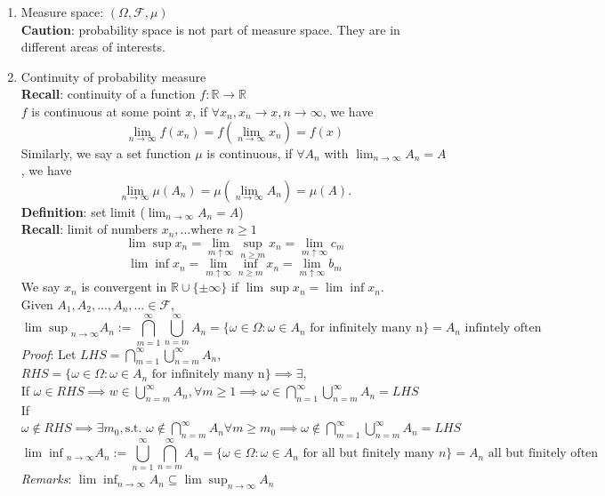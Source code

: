 \documentclass[11pt]{article}
\begin{document}
\begin{enumerate}
\item Measure space: $(\Omega ,\mathcal{F}, \mu)$\\
\textbf{Caution}: probability space is not part of measure space. They are in different areas of interests.

\item Continuity of probability measure\\
\textbf{Recall}: continuity of a function $f: \mathbb{R} \rightarrow \mathbb{R}$\\
$f$ is continuous at some point $x$, if $\forall x_n, x_n \rightarrow x, n \rightarrow \infty$, we have $$\lim_{n \rightarrow \infty} f(x_n)= f(\lim_{n \rightarrow \infty} x_n)= f(x)$$
Similarly, we say a set function $\mu$ is continuous, if $\forall A_n$ with $\lim_{n \rightarrow \infty} A_n =A$, we have $$\lim_{n \rightarrow \infty} \mu (A_n) = \mu (\lim _{n \rightarrow \infty} A_n) = \mu (A).$$
\textbf{Definition}: set limit ($\lim_{n \rightarrow \infty} A_n =A$)\\
\textbf{Recall}: limit of numbers $x_n,... \text{where } n \geq 1$
$$\lim \sup x_n = \lim_{m \uparrow \infty} \sup_{n \geq m} x_n = \lim_{m \uparrow \infty} c_{m}$$
$$\lim \inf x_n = \lim_{m \uparrow \infty} \inf_{n \geq m} x_n = \lim_{m \uparrow \infty} b_{m}$$
We say $x_n$ is convergent in $\mathbb{R} \cup \{\pm \infty \}$ if $\lim \sup x_n = \lim \inf x_n$.\\
Given $A_1, A_2,..., A_n, ... \in \mathcal{F}$,
$${\lim \sup}_{n \rightarrow \infty} A_n := \bigcap_{m=1}^{\infty} \bigcup_{n=m}^{\infty} A_n = \{\omega \in \Omega: \omega \in A_n \text{ for infinitely many n} \}= A_n \text{ infintely often}$$
\textit{Proof}: Let $LHS = \bigcap_{m=1}^{\infty} \bigcup_{n=m}^{\infty} A_n$, $RHS = \{\omega \in \Omega: \omega \in A_n \text{ for infinitely many n} \} \implies \exists $,\\
If $\omega \in RHS \implies w \in \bigcup_{n=m}^{\infty} A_n, \forall m \geq 1 \implies \omega \in \bigcap_{n=1}^{\infty} \bigcup_{n=m}^{\infty} A_n = LHS$\\
If $\omega \notin RHS \implies \exists m_0, \text{s.t. } \omega \notin \bigcap_{n=m}^{\infty} A_n \forall m \geq m_0 \implies \omega \notin \bigcap_{m=1}^{\infty} \bigcup_{n=m}^{\infty} A_n = LHS$
$${\lim \inf}_{n \rightarrow \infty} A_n := \bigcup_{n=1}^{\infty} {\bigcap_{n=m}^{\infty}} A_n = \{\omega \in \Omega: \omega \in A_n \text{ for all but finitely many }n\} = A_n \text{ all but finitely often}$$
\textit{Remarks}: $\lim \inf _{n \rightarrow \infty} A_n \subseteq \lim \sup _{n \rightarrow \infty} A_n$\\

\end{enumerate}
\end{document}
